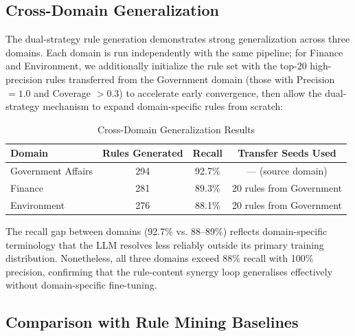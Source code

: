 \documentclass[runningheads]{llncs}
\begin{document}
\subsection{Cross-Domain Generalization}
The dual-strategy rule generation demonstrates strong generalization across three domains. Each domain is run independently with the same pipeline; for Finance and Environment, we additionally initialize the rule set with the top-20 high-precision rules transferred from the Government domain (those with Precision $= 1.0$ and Coverage $> 0.3$) to accelerate early convergence, then allow the dual-strategy mechanism to expand domain-specific rules from scratch:

\begin{table}[H]
    \centering
    \caption{Cross-Domain Generalization Results}
    \label{tab:cross_domain}
    \begin{tabular}{l c c c}
    \toprule
    Domain & Rules Generated & Recall & Transfer Seeds Used \\
    \midrule
    Government Affairs & 294 & 92.7\% & --- (source domain) \\
    Finance & 281 & 89.3\% & 20 rules from Government \\
    Environment & 276 & 88.1\% & 20 rules from Government \\
    \bottomrule
    \end{tabular}
\end{table}

The recall gap between domains (92.7\% vs. 88--89\%) reflects domain-specific terminology that the LLM resolves less reliably outside its primary training distribution. Nonetheless, all three domains exceed 88\% recall with 100\% precision, confirming that the rule-content synergy loop generalises effectively without domain-specific fine-tuning.

\subsection{Comparison with Rule Mining Baselines}%
\end{document}
